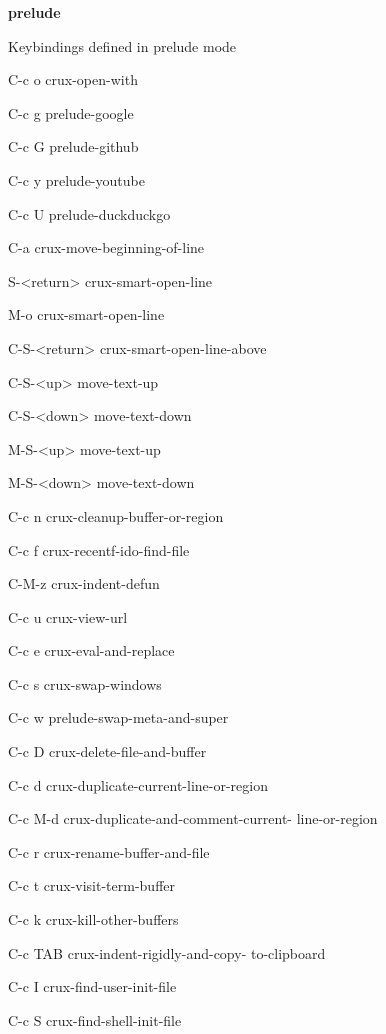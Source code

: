 \documentclass[10pt]{article}
\renewcommand\subsection[1]{\smallskip\par\textbf{\color{heading}#1}}
\newcommand\humanreadable[1]{{\par\color{default}\small\sffamily#1}}
\begin{document}
\begin{multicols}{4}
  \subsection{prelude}

  \humanreadable{Keybindings defined in prelude mode}
  \begin{keylist}
  \item[C-c o] crux-open-with
  \item[C-c g] prelude-google
  \item[C-c G] prelude-github
  \item[C-c y] prelude-youtube
  \item[C-c U] prelude-duckduckgo
  \item[C-a] crux-move-beginning-of-line
  \item[S-<return>] crux-smart-open-line
  \item[M-o] crux-smart-open-line
  \item[C-S-<return>] crux-smart-open-line-above
  \item[C-S-<up>] move-text-up
  \item[C-S-<down>] move-text-down
  \item[M-S-<up>] move-text-up
  \item[M-S-<down>] move-text-down
  \item[C-c n] crux-cleanup-buffer-or-region
  \item[C-c f] crux-recentf-ido-find-file
  \item[C-M-z] crux-indent-defun
  \item[C-c u] crux-view-url
  \item[C-c e] crux-eval-and-replace
  \item[C-c s] crux-swap-windows
  \item[C-c w] prelude-swap-meta-and-super
  \item[C-c D] crux-delete-file-and-buffer
  \item[C-c d] crux-duplicate-current-line-or-region
  \item[C-c M-d] crux-duplicate-and-comment-current-
    line-or-region
  \item[C-c r] crux-rename-buffer-and-file
  \item[C-c t] crux-visit-term-buffer
  \item[C-c k] crux-kill-other-buffers
  \item[C-c TAB] crux-indent-rigidly-and-copy-
    to-clipboard
  \item[C-c I] crux-find-user-init-file
  \item[C-c S] crux-find-shell-init-file

\end{keylist}
\end{multicols}
\end{document}
